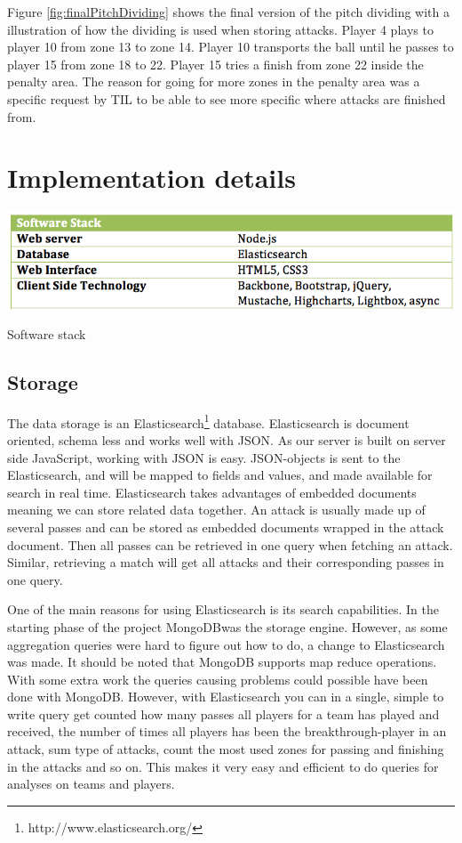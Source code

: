 Figure \ref{fig:finalPitchDividing} shows the final version of the pitch dividing with a illustration of how the dividing is used when storing attacks. Player 4 plays to player 10 from zone 13 to zone 14.  Player 10 transports the ball until he passes to player 15 from zone 18 to 22. Player 15 tries a finish from zone 22 inside the penalty area. The reason for going for more zones in the penalty area was a specific request by \ac{TIL} to be able to see more specific where attacks are finished from.

\section{Implementation details}

\begin{table}[ht!]
\centering
\includegraphics[width=1\textwidth]{images/implementation/software_stack.png}
\caption{Software stack}
\end{table}

\subsection{Storage}

The data storage is an Elasticsearch\footnote{http://www.elasticsearch.org/} database. Elasticsearch is document oriented, schema less and works well with \ac{JSON}\footnotemark. As our server is built on server side JavaScript, working with \ac{JSON} is easy. \ac{JSON}-objects is sent to the Elasticsearch, and will be mapped to fields and values, and made available for search in real time.
Elasticsearch takes advantages of embedded documents meaning we can store related data together. An attack is usually made up of several passes and can be stored as embedded documents wrapped in the attack document. Then all passes can be retrieved in one query when fetching an attack. Similar, retrieving a match will get all attacks and their corresponding passes in one query.

One of the main reasons for using Elasticsearch is its search capabilities. In the starting phase of the project MongoDB\footnotemark was the storage engine. However, as some aggregation queries were hard to figure out how to do, a change to Elasticsearch was made. It should be noted that MongoDB supports map reduce operations. With some extra work the queries causing problems could possible have been done with MongoDB. However, with Elasticsearch you can in a single, simple to write query get counted how many passes all players for a team has played and received, the number of times all players has been the breakthrough-player in an attack, sum type of attacks, count the most used zones for passing and finishing in the attacks and so on. This makes it very easy and efficient to do queries for analyses on teams and players.

